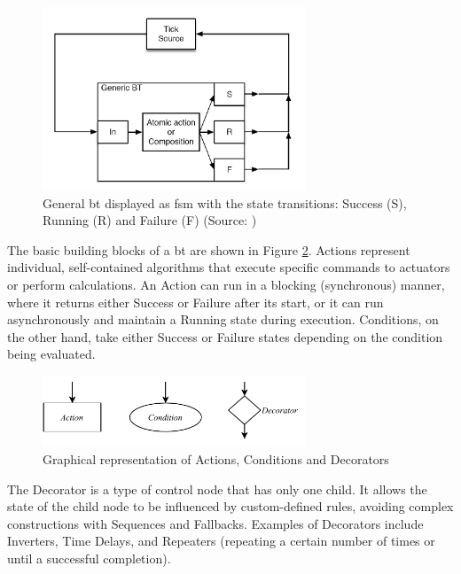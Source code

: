\begin{figure}[h]
    \centering
    \includegraphics[width=0.7\textwidth]{figures/20_state_of_the_art/fsm_general_bt.png}
    \caption[General \gls{bt} displayed as \gls{fsm}]{General \gls{bt} displayed as \gls{fsm} with the state transitions: Success (S), Running (R) and Failure (F) (Source: \cite{colledanchise_behavior_2018})}
    \label{fig:fsm_general_bt}
\end{figure}

The basic building blocks of a \gls{bt} are shown in Figure \ref{fig:bt_types}. Actions represent individual, self-contained algorithms that execute specific commands to actuators or perform calculations. An Action can run in a blocking (synchronous) manner, where it returns either Success or Failure after its start, or it can run asynchronously and maintain a Running state during execution. Conditions, on the other hand, take either Success or Failure states depending on the condition being evaluated.

\begin{figure}[h]
    \centering
    \includegraphics[width=0.7\textwidth]{figures/20_state_of_the_art/bt_types.pdf}
    \caption{Graphical representation of Actions, Conditions and Decorators}
    \label{fig:bt_types}
\end{figure}

The Decorator is a type of control node that has only one child. It allows the state of the child node to be influenced by custom-defined rules, avoiding complex constructions with Sequences and Fallbacks. Examples of Decorators include Inverters, Time Delays, and Repeaters (repeating a certain number of times or until a successful completion).

